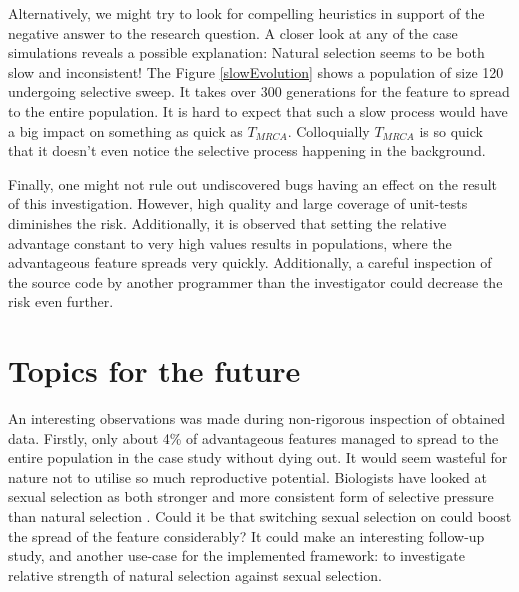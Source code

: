 \documentclass{l4proj}
\begin{document}
Alternatively, we might try to look for compelling heuristics in support of the negative answer to the research question. A closer look at any of the case simulations reveals a possible explanation: Natural selection seems to be both slow and inconsistent! The Figure \ref{slowEvolution} shows a population of size 120 undergoing selective sweep. It takes over 300 generations for the feature to spread to the entire population. It is hard to expect that such a slow process would have a big impact on something as quick as $T_{MRCA}$. Colloquially $T_{MRCA}$ is so quick that it doesn't even notice the selective process happening in the background.

Finally, one might not rule out undiscovered bugs having an effect on the result of this investigation. However, high quality and large coverage of unit-tests diminishes the risk. Additionally, it is observed that setting the relative advantage constant to very high values results in populations, where the advantageous feature spreads very quickly. Additionally, a careful inspection of the source code by another programmer than the investigator could decrease the risk even further.

\section{Topics for the future}

\begin{samepage}

An interesting observations was made during non-rigorous inspection of obtained data. Firstly, only about 4\% of advantageous features managed to spread to the entire population in the case study without dying out. It would seem wasteful for nature not to utilise so much reproductive potential. Biologists have looked at sexual selection as both stronger and more consistent form of selective pressure than natural selection \parencite{Miller14}. Could it be that switching sexual selection on could boost the spread of the feature considerably? It could make an interesting follow-up study, and another use-case for the implemented framework: to investigate relative strength of natural selection against sexual selection.

\end{samepage}

\printglossaries
\printbibliography[heading=bibintoc]
\end{document}
